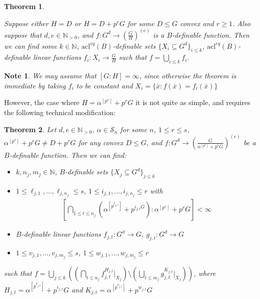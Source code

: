 \documentclass[a4paper,11pt]{article}
\newtheorem{theorem}{Theorem}[section]
\newtheorem{definition}[theorem]{Definition}
\newtheorem*{note}{Note}
\newcommand{\acl}{\textrm{acl}}
\newcommand{\Sn}{\mathcal{S}_n}
\begin{document}
\begin{theorem}\label{main}
	
	Suppose either $H = D$ or $H= D+p^rG$ for some $D\leq G$ convex and $r\geq 1$. Also suppose that $d,e\in\mathbb{N}_{>0}$, and $f:G^d\rightarrow (\frac{G}{H})^{(e)}$ is a $B$-definable function. Then we can find some $k\in \mathbb{N}$, $\acl^{eq}(B)$-definable sets $\{X_i\subseteq G^d\}_{i\leq k}$, $\acl^{eq}(B)$-definable linear functions $f_i:X_i\rightarrow \frac{G}{H}$ such that $f = \bigcup\limits_{i\leq k}f_i$.
\end{theorem}
\begin{note}
	We may assume that $[G:H]=\infty$, since otherwise the theorem is immediate by taking $f_i$ to be constant and $X_i = \{\bar x:f(\bar x) = f_i(\bar x)\}$
\end{note}
\noindent However, the case where $H= \alpha^{[p^s]}+p^rG$ it is not quite as simple, and requires the following technical modification:
\newpage
\begin{theorem}\label{(theorem) main for a^p^s+p^rG}
	Let $d,e\in\mathbb{N}_{>0}$, $\alpha\in \Sn$ for some $n$, $1\leq r \leq s$, $\alpha^{[p^s]}+p^rG \neq D+p^rG$ for any convex $D\leq G$, and $f:G^d\rightarrow (\frac{G}{\alpha^{[p^s]}+p^rG})^{(e)}$ be a $B$-definable function. Then we can find:
	\begin{itemize}
		\item $k, n_j, m_j\in \mathbb{N}$,  $B$-definable sets $\{X_j\subseteq G^d\}_{j\leq k}$
		\item $1\leq \ell_{j,1},\dots,\ell_{j,n_j}\leq s$, $1 \leq i_{j,1},\dots,i_{j,n_j}\leq r$ with 
        \begin{align*}
            \left[\bigcap\limits_{1\leq t\leq n_j}(\alpha^{[p^{\ell_{j,t}}]}+p^{i_{j,t}G}):\alpha^{[p^s]}+p^rG\right]<\infty
        \end{align*}
		\item $B$-definable linear functions $f_{j,t}:G^d\rightarrow G$, $g_{j,t}:G^d\rightarrow G$
		\item $1\leq v_{j,1},\dots,v_{j,m_j}\leq s$, $1\leq w_{j,1},\dots,w_{j,m_j}\leq r$
	\end{itemize} such that $f = \bigcup\limits_{j\leq k} ((\bigcap\limits_{t\leq n_j}f_{j,t}^{H_{j,t}}|_{X_j})\setminus(\bigcup\limits_{t\leq m_j}g_{j,t}^{K_{j,t}}|_{X_j}))$, where $H_{j,t}=\alpha^{[p^{\ell_{j,t}}]}+p^{i_{j,t}}G$ and $K_{j,t} = \alpha^{[p^{v_{j,t}}]}+p^{w_{j,t}}G$
\end{theorem}
\end{document}
